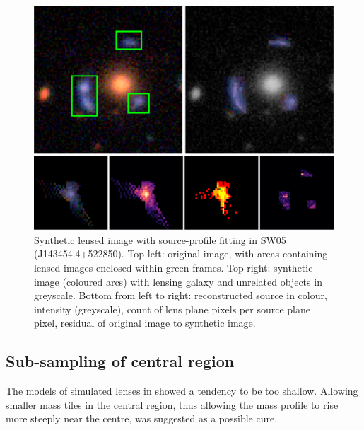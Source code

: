 \begin{figure}
  \includegraphics[width=\linewidth]{img/new_synth_img_detailed}
  \caption{Synthetic lensed image with source-profile fitting in SW05
    (J143454.4+522850). Top-left: original image, with areas
    containing lensed images enclosed within green frames.  Top-right:
    synthetic image (coloured arcs) with lensing galaxy and unrelated
    objects in greyscale.  Bottom from left to right: reconstructed
    source in colour, intensity (greyscale), count of lens plane
    pixels per source plane pixel, residual of original image to
    synthetic image.}
  \label{fig:synthimg}
\end{figure}

\subsection{Sub-sampling of central region}\label{subsec:hires}

The models of simulated lenses in \cite{2015MNRAS.447.2170K} showed a
tendency to be too shallow.  Allowing smaller mass tiles in the
central region, thus allowing the mass profile to rise more steeply
near the centre, was suggested as a possible cure.

